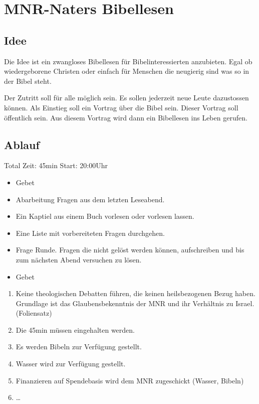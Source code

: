 \documentclass{mybib}
\begin{document}
    
    \section{MNR-Naters Bibellesen}
    \subsection{Idee}
    Die Idee ist ein zwangloses Bibellesen für Bibelinteressierten anzubieten. Egal ob wiedergeborene Christen oder einfach für Menschen die neugierig sind was so in der Bibel steht.

    Der Zutritt soll für alle möglich sein. Es sollen jederzeit neue Leute dazustossen können. Als Einstieg soll ein Vortrag über die Bibel sein. Dieser Vortrag soll öffentlich sein. Aus diesem Vortrag wird dann ein Bibellesen ins Leben gerufen.

    \subsection{Ablauf}
    Total Zeit: 45min
    Start: 20:00Uhr
    \begin{itemize}
        \item Gebet
        \item Abarbeitung Fragen aus dem letzten Leseabend.
        \item Ein Kaptiel aus einem Buch vorlesen oder vorlesen lassen.
        \item Eine Liste mit vorbereiteten Fragen durchgehen.
        \item Frage Runde. Fragen die nicht gelöst werden können, aufschreiben und bis zum nächsten Abend versuchen zu lösen.
        \item Gebet
    \end{itemize}
    \begin{enumerate}
        \item Keine theologischen Debatten führen, die keinen heilsbezogenen Bezug haben. Grundlage ist das Glaubensbekenntnis der MNR und ihr Verhältnis zu Israel. (Foliensatz)
        \item Die 45min müssen eingehalten werden.
        \item Es werden Bibeln zur Verfügung gestellt.
        \item Wasser wird zur Verfügung gestellt.
        \item Finanzieren auf Spendebasis wird dem MNR zugeschickt (Wasser, Bibeln)
        \item \dots       
    \end{enumerate}
    
\end{document}
